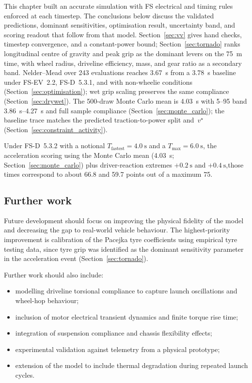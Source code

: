 \documentclass[11pt, a4paper]{report}
\numberwithin{equation}{section}
\begin{document}
\begin{refsection}
\noindent 
This chapter built an accurate simulation with FS electrical and timing rules enforced at each timestep. The conclusions below discuss the validated predictions, dominant sensitivities, optimisation result, uncertainty band, and scoring readout that follow from that model.
Section~\ref{sec:vv} gives hand checks, timestep convergence, and a constant-power bound; Section~\ref{sec:tornado} ranks longitudinal centre of gravity and peak grip as the dominant levers on the \SI{75}{\metre} time, with wheel radius, driveline efficiency, mass, and gear ratio as a secondary band.
Nelder--Mead over \num{243} evaluations reaches \SI{3.67}{\second} from a \SI{3.78}{\second} baseline under FS-EV~2.2, FS-D~5.3.1, and with non-wheelie conditions (Section~\ref{sec:optimisation}); wet grip scaling preserves the same compliance (Section~\ref{sec:drywet}).
The \num{500}-draw Monte Carlo mean is \SI{4.03}{\second} with 5--95 band \SIrange{3.86}{4.27}{\second} and full sample compliance (Section~\ref{sec:monte_carlo}); the baseline trace matches the predicted traction-to-power split and~$v^\star$ (Section~\ref{sec:constraint_activity}).

Under FS-D~5.3.2 with  a notional $T_\text{fastest}=\SI{4.0}{\second}$ and a $T_\text{max}=\SI{6.0}{\second}$, the acceleration scoring using the Monte Carlo mean (\SI{4.03}{\second}; Section~\ref{sec:monte_carlo}) plus driver-reaction extremes $+\SI{0.2}{\second}$ and $+\SI{0.4}{\second}$,those times correspond to about 66.8 and 59.7 points out of a maximum 75.

\subsection{Further work}
\label{sec:further_work}

Future development should focus on improving the physical fidelity of the model and decreasing the gap to real-world vehicle behaviour.
The highest-priority improvement is calibration of the Pacejka tyre coefficients using empirical tyre testing data, since tyre grip was identified as the dominant sensitivity parameter in the acceleration event (Section~\ref{sec:tornado}).

Further work should also include:
\begin{itemize}
    \item modelling driveline torsional compliance to capture launch oscillations and wheel-hop behaviour;
    \item inclusion of motor electrical transient dynamics and finite torque rise time;
    \item integration of suspension compliance and chassis flexibility effects;
    \item experimental validation against telemetry from a physical prototype;
    \item extension of the model to include thermal degradation during repeated launch cycles.
\end{itemize}


\end{refsection}
\end{document}

